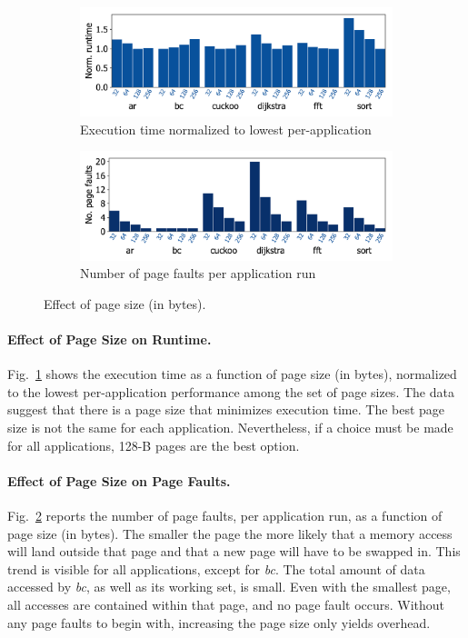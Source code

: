 \begin{figure}
	\centering
    \begin{subfigure}{\columnwidth}
			\centering
        \includegraphics[width=.8\columnwidth]{figures/page_exec-time.pdf}
        \caption{Execution time normalized to lowest per-application}
        \label{fig:page-exec-time}
    \end{subfigure}
    \begin{subfigure}{\columnwidth}
			\centering
        \includegraphics[width=.8\columnwidth]{figures/pagePulls.pdf}
        \caption{Number of page faults per application run}
        \label{fig:page-pulls}
    \end{subfigure}
    \caption{Effect of page size (in bytes).}
    \label{fig:war}
\end{figure}

\paragraph{Effect of Page Size on Runtime.}

Fig.~\ref{fig:page-exec-time} shows the execution time as a function
of page size (in bytes), normalized to the lowest per-application performance among the
set of page sizes.
The data suggest that there is a page size that minimizes execution time.
The best page size is not the same for
each application. Nevertheless, if a choice must be made for all applications,
128-B pages are the best option.

\paragraph{Effect of Page Size on Page Faults.}

Fig.~\ref{fig:page-pulls} reports the number of page faults, per application
run, as a function of page size (in bytes).
%
The smaller the page the more likely that a memory access will land
outside that page and that a new page will have to be swapped in.
%
This trend is visible for all applications, except for \textit{bc}. The total
amount of data accessed by \textit{bc}, as well as its working set, is small.
Even with the smallest page, all accesses are contained within that page, and
no page fault occurs. Without any page faults to begin with, increasing the
page size only yields overhead.
